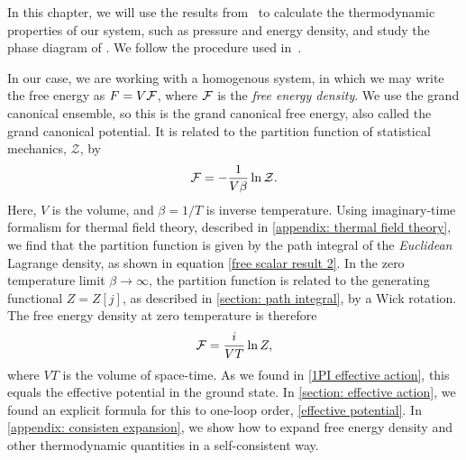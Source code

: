 In this chapter, we will use the results from \chpt\ to calculate the thermodynamic properties of our system, such as pressure and energy density, and study the phase diagram of \chpt.
We follow the procedure used in~\autocite{adhikariTwoflavorChiralPerturbation2019,martinariaTwoflavorChiralPerturbation2020}.

In our case, we are working with a homogenous system, in which we may write the free energy as $F = V\mathcal{F}$, where $\mathcal{F}$ is the \emph{free energy density}.
We use the grand canonical ensemble, so this is the grand canonical free energy, also called the grand canonical potential.
It is related to the partition function of statistical mechanics, $\mathcal{Z}$, by
%
\begin{equation}
    \mathcal{F} = - \frac{1}{V \beta} \ln \mathcal{Z}.
\end{equation}
%
Here, $V$ is the volume, and $\beta = 1/T$ is inverse temperature.
Using imaginary-time formalism for thermal field theory, described in \autoref{appendix: thermal field theory}, we find that the partition function is given by the path integral of the \emph{Euclidean} Lagrange density, as shown in equation \autoref{free scalar result 2}.
In the zero temperature limit  $\beta \rightarrow \infty$, the partition function is related to the generating functional $Z = Z[j]$, as described in \autoref{section: path integral}, by a Wick rotation.
The free energy density at zero temperature is therefore
%
\begin{equation}
    \mathcal{F} = \frac{i}{VT} \ln Z,
\end{equation}
%
where $VT$ is the volume of space-time.
As we found in \autoref{1PI effective action}, this equals the effective potential in the ground state.
In \autoref{section: effective action}, we found an explicit formula for this to one-loop order, \autoref{effective potential}.
In \autoref{appendix: consisten expansion}, we show how to expand free energy density and other thermodynamic quantities in a self-consistent way.

